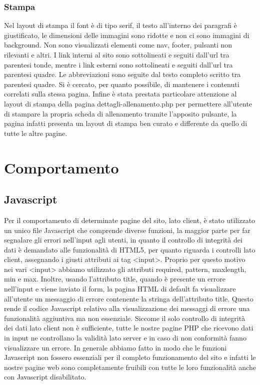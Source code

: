 \documentclass[a4paper]{article}
\begin{document}
    \subsubsection{Stampa}
    Nel layout di stampa il font è di tipo serif, il testo all’interno dei paragrafi è giustificato, le dimensioni delle immagini sono ridotte e non ci sono immagini di background. Non sono visualizzati elementi come nav, footer, pulsanti non rilevanti e altri. I link interni al sito sono sottolineati e seguiti dall’url tra parentesi tonde, mentre i link esterni sono sottolineati e seguiti dall’url tra parentesi quadre. Le abbreviazioni sono seguite dal testo completo scritto tra parentesi quadre. Si è cercato, per quanto possibile, di mantenere i contenuti correlati sulla stessa pagina. Infine è stata prestata particolare attenzione al layout di stampa della pagina dettagli-allenamento.php per permettere all’utente di stampare la propria scheda di allenamento tramite l’apposito pulsante, la pagina infatti presenta un layout di stampa ben curato e differente da quello di tutte le altre pagine.

    \section{Comportamento}

    \subsection{Javascript}
    Per il comportamento di determinate pagine del sito, lato client, è stato utilizzato un unico file Javascript che comprende diverse funzioni, la maggior parte per far segnalare gli errori nell’input agli utenti, in quanto il controllo di integrità dei dati è demandato alle funzionalità di HTML5, per quanto riguarda i controlli lato client, assegnando i giusti attributi ai tag <input>. Proprio per questo motivo nei vari <input> abbiamo utilizzato gli attributi required, pattern, maxlength, min e max. Inoltre, usando l'attributo title, quando è presente un errore nell’input e viene inviato il form, la pagina HTML di default fa visualizzare all’utente un messaggio di errore contenente la stringa dell’attributo title. Questo rende il codice Javascript relativo alla visualizzazione dei messaggi di errore una funzionalità aggiuntiva ma non essenziale. Siccome il solo controllo di integrità dei dati lato client non è sufficiente, tutte le nostre pagine PHP che ricevono dati in input ne controllano la validità lato server e in caso di non conformità fanno visualizzare un errore.  In generale abbiamo fatto in modo che le funzioni Javascript non fossero essenziali per il completo funzionamento del sito e  infatti le nostre pagine web sono completamente fruibili con tutte le loro funzionalità anche con Javascript disabilitato.
\end{document}
